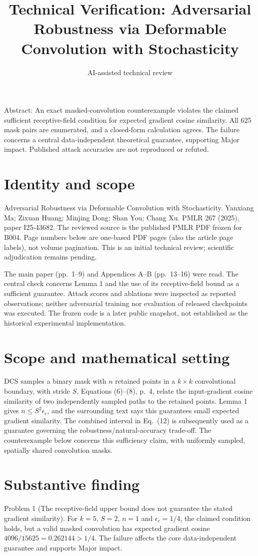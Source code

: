 \documentclass[10pt]{article}
\title{Technical Verification: Adversarial Robustness via Deformable Convolution with Stochasticity}
\author{AI-assisted technical review}
\date{}
\begin{document}
\maketitle
Abstract: An exact masked-convolution counterexample violates the claimed sufficient receptive-field condition for expected gradient cosine similarity. All 625 mask pairs are enumerated, and a closed-form calculation agrees. The failure concerns a central data-independent theoretical guarantee, supporting Major impact. Published attack accuracies are not reproduced or refuted.\par
\section*{Identity and scope}
Adversarial Robustness via Deformable Convolution with Stochasticity. Yanxiang Ma; Zixuan Huang; Minjing Dong; Shan You; Chang Xu. PMLR 267 (2025), paper I25-43682. The reviewed source is the published PMLR PDF frozen for B004. Page numbers below are one-based PDF pages (also the article page labels), not volume pagination. This is an initial technical review; scientific adjudication remains pending.\par
The main paper (pp. 1–9) and Appendices A–B (pp. 13–16) were read. The central check concerns Lemma 1 and the use of its receptive-field bound as a sufficient guarantee. Attack scores and ablations were inspected as reported observations; neither adversarial training nor evaluation of released checkpoints was executed. The frozen code is a later public snapshot, not established as the historical experimental implementation.\par
\section*{Scope and mathematical setting}
DCS samples a binary mask with \(n\) retained points in a \(k\times k\) convolutional boundary, with stride \(S\). Equations (6)–(8), p. 4, relate the input-gradient cosine similarity of two independently sampled paths to the retained points. Lemma 1 gives \(n\le S^2\epsilon_c\), and the surrounding text says this guarantees small expected gradient similarity. The combined interval in Eq. (12) is subsequently used as a guarantee governing the robustness/natural-accuracy trade-off. The counterexample below concerns this sufficiency claim, with uniformly sampled, spatially shared convolution masks.\par
\section*{Substantive finding}
Problem 1 (The receptive-field upper bound does not guarantee the stated gradient similarity).  For \(k=5\), \(S=2\), \(n=1\) and \(\epsilon_c=1/4\), the claimed condition holds, but a valid masked convolution has expected gradient cosine \(4096/15625=0.262144>1/4\). The failure affects the core data-independent guarantee and supports Major impact.\par
\end{document}

